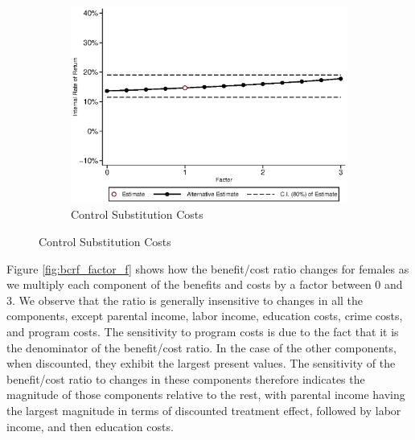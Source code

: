 \begin{figure}[H]
\ContinuedFloat		
	\begin{subfigure}[h]{0.8\textwidth}
	\centering
	\caption{Control Substitution Costs} \label{fig:irrf_cc_m1}
	\includegraphics[width=\textwidth]{AppOutput/Sensitivity/irrf_cc_m1.eps}
	\end{subfigure}
	
\end{figure}

\noindent Figure \ref{fig:bcrf_factor_f} shows how the benefit/cost ratio changes for females as
we multiply each component of the benefits and costs by a factor between 0 and 3. We 
observe that the ratio is generally insensitive to changes in all the components, 
except parental income, labor income, education costs, crime costs, and program costs. The sensitivity
to program costs is due to the fact that it is the denominator of the 
benefit/cost ratio. In the case of the other components, when discounted, 
they exhibit the largest present values. The sensitivity of the benefit/cost
ratio to changes in these components therefore indicates the magnitude of those 
components relative to the rest, with parental income having the largest magnitude
in terms of discounted treatment effect, followed by labor income, and then
education costs. 

